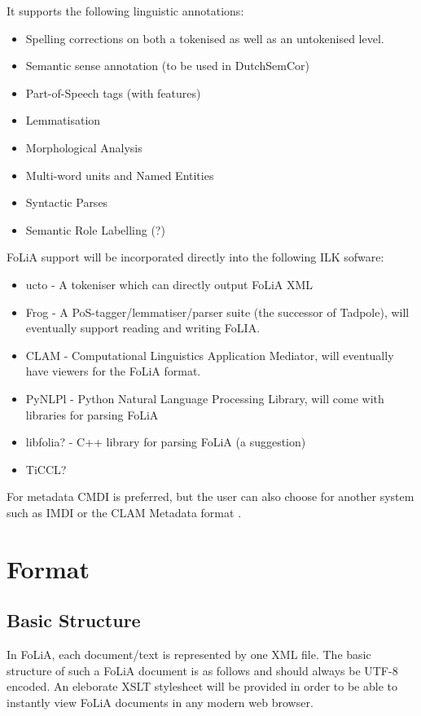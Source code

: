 It supports the following linguistic annotations:

\begin{itemize}
\item Spelling corrections on both a tokenised as well as an untokenised level.
\item Semantic sense annotation (to be used in DutchSemCor)
\item Part-of-Speech tags (with features)
\item Lemmatisation
\item Morphological Analysis
\item Multi-word units and Named Entities
\item Syntactic Parses
\item Semantic Role Labelling (?)
\end{itemize}


FoLiA support will be incorporated directly into the following ILK sofware:


\begin{itemize} 
\item ucto - A tokeniser which can directly output FoLiA XML 
\item Frog - A PoS-tagger/lemmatiser/parser suite (the successor of Tadpole), will eventually support reading and writing FoLIA.
\item CLAM - Computational Linguistics Application Mediator, will eventually have viewers for the FoLiA format.
\item PyNLPl - Python Natural Language Processing Library, will come with libraries for parsing FoLiA
\item libfolia? - C++ library for parsing FoLiA (a suggestion)
\item TiCCL?
\end{itemize}

For metadata CMDI is preferred, but the user can also choose for another system such as IMDI \cite{IMDI} or the CLAM Metadata format \cite{CLAM}.

\section{Format}

\subsection{Basic Structure}

In FoLiA, each document/text is represented by one XML file. The basic structure of such a FoLiA document is as follows and should always be UTF-8 encoded. An eleborate XSLT stylesheet will be provided in order to be able to instantly view FoLiA documents in any modern web browser.


